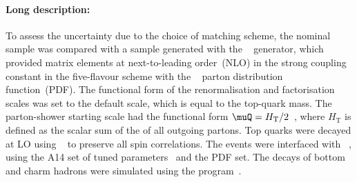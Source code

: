\paragraph{Long description:}

To assess the uncertainty due to the choice of matching scheme, the nominal sample was compared with a sample generated
with the \MGNLO[2.6.2]~\cite{Alwall:2014hca} generator, which provided matrix elements at next-to-leading order~(NLO) in the strong coupling constant \alphas
in the five-flavour scheme with the \NNPDF[3.0nlo]~\cite{Ball:2014uwa} parton distribution function~(PDF).
The functional form of the renormalisation and factorisation scales was set to the default scale, which is equal to the top-quark mass.
The parton-shower starting scale had the functional form $\muQ = H_{\mathrm T}/2$~\cite{ATL-PHYS-PUB-2017-007}, 
where $H_{\mathrm T}$ is defined as the scalar sum of the \pT of all outgoing partons.
Top quarks were decayed at LO using \MADSPIN~\cite{Frixione:2007zp,Artoisenet:2012st} to preserve all spin correlations.
The events were interfaced with \PYTHIA[8.230]~\cite{Sjostrand:2014zea}, using the A14 set of tuned parameters~\cite{ATL-PHYS-PUB-2014-021} 
and the \NNPDF[2.3lo] PDF set.
The decays of bottom and charm hadrons were simulated using the \EVTGEN[1.6.0] program~\cite{Lange:2001uf}.
